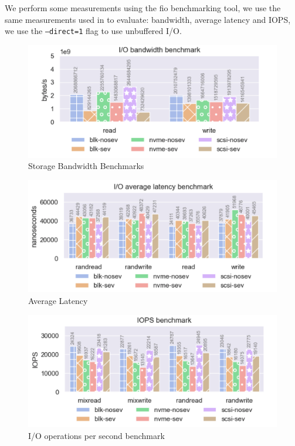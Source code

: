 \documentclass[twocolumn]{article}
\begin{document}
We perform some measurements using the fio \cite{fio} benchmarking tool, we use the same measurements used in \cite{spool} to evaluate: bandwidth, average latency and IOPS, we use the \texttt{--direct=1} flag to use unbuffered I/O.


\begin{figure}
    \centering
    \includegraphics[width=\columnwidth]{img/bw.png}
    \caption{Storage Bandwidth Benchmarks}
\end{figure}
\begin{figure}
    \centering
    \includegraphics[width=\columnwidth]{img/al.png}
    \caption{Average Latency}
\end{figure}
\begin{figure}
    \centering
    \includegraphics[width=\columnwidth]{img/iops.png}
    \caption{I/O operations per second benchmark}
\end{figure}
\end{document}
